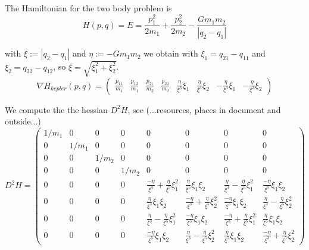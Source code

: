 \documentclass[12pt]{article}
\begin{document}
The Hamiltonian for the two body problem is
\begin{equation}\label{eq:hamiltonian kepler}
    H(p,q) = E = \frac{p_1^2}{2m_1} + \frac{p_2^2}{2m_2} - \frac{G m_1m_2}{|q_2-q_1|}
\end{equation}

with $\xi := |q_2-q_1|$ and $\eta := -Gm_1m_2$ we obtain with $\xi_1 = q_{21} - q_{11}$ and $\xi_2 = q_{22} - q_{12}$, so $\xi = \sqrt{\xi_1^2 + \xi_2^2}$. 
\begin{equation}\label{eq:nabla hamiltonian kepler}
    \nabla H_{kepler}(p,q) = \begin{pmatrix} 
    \frac{p_{11}}{m_1} & \frac{p_{12}}{m_1} & \frac{p_{21}}{m_2} & \frac{p_{22}}{m_2} & 
    \frac\eta{\xi^3} \xi_1 & \frac\eta{\xi^3} \xi_2 & -\frac\eta{\xi^3} \xi_1 & -\frac\eta{\xi^3} \xi_2 
    \end{pmatrix}
\end{equation}

We compute the the hessian $D^2 H$, see (...resources, places in document and outside...)
\begin{equation}\label{eq:hessian of hamiltonian kepler}
    D^2 H =
    \left(\begin{array}{cccc|cccc}
    1/m_1 & 0 & 0 & 0    &    0 & 0 & 0 & 0\\
    0 & 1/m_1 & 0 & 0    &    0 & 0 & 0 & 0\\
    0 & 0 & 1/m_2 & 0    &    0 & 0 & 0 & 0\\
    0 & 0 & 0 & 1/m_2    &    0 & 0 & 0 & 0\\
    \hline 
    0 & 0 & 0 & 0        &    \frac{-\eta}{\xi^3} + \frac{\eta}{\xi^5}\xi_1^2 & \frac{\eta}{\xi^5}\xi_1\xi_2 & \frac{\eta}{\xi^3} - \frac{\eta}{\xi^5}\xi_1^2 & \frac{-\eta}{\xi^5}\xi_1\xi_2 \\
    0 & 0 & 0 & 0        &    \frac{\eta}{\xi^5}\xi_1\xi_2 & \frac{-\eta}{\xi^3} + \frac{\eta}{\xi^5}\xi_2^2 & \frac{-\eta}{\xi^5}\xi_1\xi_2 & \frac{\eta}{\xi^3} - \frac{\eta}{\xi^5}\xi_2^2 \\
    0 & 0 & 0 & 0        &    \frac{\eta}{\xi^3} - \frac{\eta}{\xi^5}\xi_1^2 & \frac{-\eta}{\xi^5}\xi_1\xi_2 & \frac{-\eta}{\xi^3} + \frac{\eta}{\xi^5}\xi_1^2 & \frac{\eta}{\xi^5}\xi_1\xi_2 \\
    0 & 0 & 0 & 0        &    \frac{-\eta}{\xi^5}\xi_1\xi_2 & \frac{\eta}{\xi^3} - \frac{\eta}{\xi^5}\xi_2^2 & \frac{\eta}{\xi^5}\xi_1\xi_2 & \frac{-\eta}{\xi^3} + \frac{\eta}{\xi^5}\xi_2^2
    \end{array}\right)
\end{equation}
\end{document}
